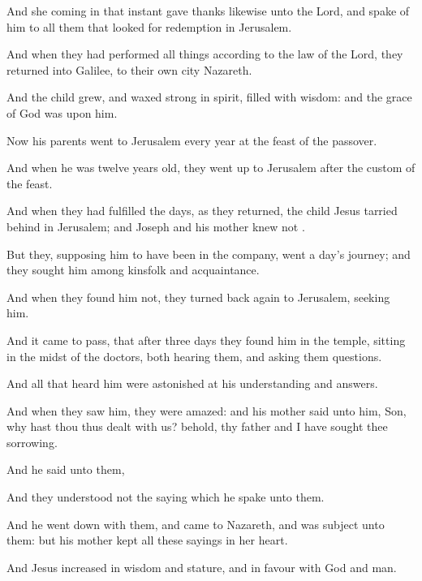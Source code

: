 {And
she coming
in
that
instant gave thanks
likewise unto the
Lord,
and
spake
of
him to
all them that
looked for
redemption
in
Jerusalem.

And
when they had
performed all
things according
to the
law of the
Lord, they
returned
into
Galilee,
to their
own
city
Nazareth.

And the
child
grew,
and waxed
strong in
spirit,
filled with
wisdom:
and the
grace of
God
was
upon
him.

Now
his
parents
went
to
Jerusalem
every
year at the
feast of the
passover.

And
when he
was
twelve years
old,
they went
up
to
Jerusalem
after the
custom of the
feast.

And when they had
fulfilled the
days,
as
they
returned, the
child
Jesus tarried
behind
in
Jerusalem;
and
Joseph
and
his
mother
knew
not
{}.

But they,
supposing
him to have
been
in the
company,
went a
day’s
journey;
and they
sought
him
among
{}
kinsfolk
and
acquaintance.

And when they
found
him
not, they turned back
again
to
Jerusalem,
seeking
him.

And it came to
pass, that
after
three
days they
found
him
in the
temple,
sitting
in the
midst of the
doctors,
both
hearing
them,
and
asking
them
questions.

And
all that
heard
him were
astonished
at
his
understanding
and
answers.

And when they
saw
him, they were
amazed:
and
his
mother
said
unto
him,
Son,
why hast
thou
thus
dealt with
us?
behold,
thy
father and
I have
sought
thee
sorrowing.

And he
said
unto
them,
{}

And
they
understood
not the
saying
which he
spake unto
them.

And he went
down
with
them,
and
came
to
Nazareth,
and
was subject
unto
them:
but
his
mother
kept
all
these
sayings
in
her
heart.

And
Jesus
increased in
wisdom
and
stature,
and in
favour
with
God
and
man.




\par }
